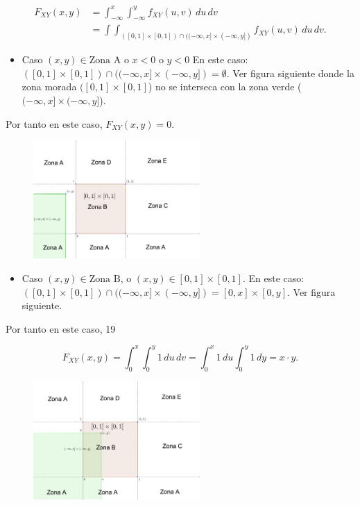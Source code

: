 \documentclass[]{book}
\providecommand{\tightlist}{%
  \setlength{\itemsep}{0pt}\setlength{\parskip}{0pt}}
\begin{document}
\[
\begin{array}{rl}
F_{XY}(x,y)&=\int_{-\infty}^x\int_{-\infty}^y f_{XY}(u,v)\,du\,dv\\ &=
\int\int_{([0,1]\times [0,1])\cap ((-\infty,x]\times (-\infty,y])} f_{XY}(u,v)\,du\,dv.
\end{array}
\]

\begin{itemize}
\tightlist
\item
  Caso \((x,y)\in \mbox{Zona A}\) o \(x<0\) o \(y<0\) En este caso: \(([0,1]\times [0,1])\cap ((-\infty,x]\times (-\infty,y])=\emptyset.\) Ver figura siguiente donde la zona morada \(([0,1]\times [0,1]\)) no se interseca con la zona verde (\((-\infty,x]\times (-\infty,y]\)).
\end{itemize}

Por tanto en este caso, \(F_{XY}(x,y)=0\).

\begin{figure}
\includegraphics[width=2.5in]{Images/VaUniformeBidi3} \end{figure}

\begin{itemize}
\tightlist
\item
  Caso \((x,y)\in \mbox{Zona B}\), o \((x,y)\in [0,1]\times [0,1]\). En este caso: \(([0,1]\times [0,1])\cap ((-\infty,x]\times (-\infty,y])=[0,x]\times [0,y].\) Ver figura siguiente.
\end{itemize}

Por tanto en este caso,
19

\[
F_{XY}(x,y)=\int_0^x \int_0^y 1\,du\,dv =\int_0^x 1\, du\int_0^y 1\, dy =x\cdot y.
\]

\begin{figure}
\includegraphics[width=2.5in]{Images/VaUniformeBidi4} \end{figure}
\end{document}
